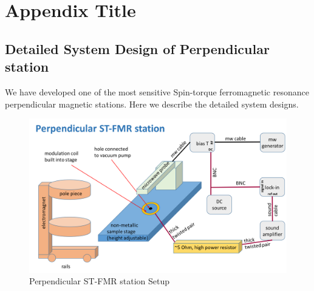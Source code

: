
\appendix
\chapter{Appendix Title}



\section{Detailed System Design of Perpendicular station}


We have developed one of the most sensitive Spin-torque ferromagnetic resonance perpendicular magnetic stations. Here we describe the detailed system designs.


\begin{figure}[t]
  \centering
  \includegraphics[width=1.0\textwidth]{fig/appendix/setup.png}
  \caption{Perpendicular ST-FMR station Setup}
  \label{fig:stationsetup}
\end{figure}



